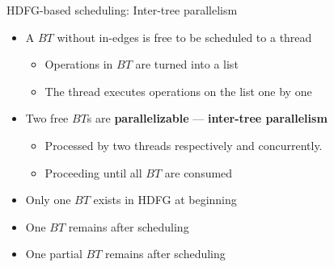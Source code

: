 \documentclass{beamer}
\begin{document}
\begin{CJK}{UTF8}{bkai}
            \begin{frame}{HDFG-based scheduling: Inter-tree parallelism}
                \begin{itemize}
                    \item <3->{A $BT$ without in-edges is free to be scheduled to a thread
                        \begin{itemize}
                            \item Operations in $BT$ are turned into a list
                            \item The thread executes operations on the list one by one
                        \end{itemize}
                    }
                \item <4->{Two free $BT$s are \textbf{parallelizable} --- \textbf{inter-tree parallelism}
                        \begin{itemize}
                            \item Processed by two threads respectively and concurrently.
                            \item Proceeding until all $BT$ are consumed
                        \end{itemize}
                    }
                \end{itemize}
                \begin{itemize}
                    \item <6->{Only one $BT$ exists in HDFG at beginning}
                    \item <7->{One $BT$ remains after scheduling}
                    \item <8->{One partial $BT$ remains after scheduling}
                \end{itemize}
                \vspace{1em}
                \centering
            \end{frame}


\end{CJK}
\end{document}

